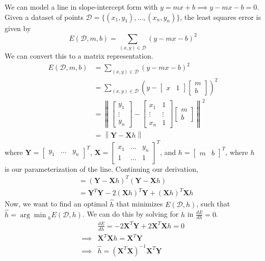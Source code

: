 \documentclass[a4paper, 12pt]{article}
\begin{document}
We can model a line in slope-intercept form with $y = mx + b \implies y - mx - b = 0$.  Given a dataset of points $\mathcal{D} = \{(x_1, y_1), ..., (x_n, y_n)\}$, the least squares error is given by
\[
E(\mathcal{D}, m, b) = \sum_{(x, y) \in \mathcal{D}} (y - mx - b)^2
\]
We can convert this to a matrix representation.
\begin{align*}
E(\mathcal{D}, m, b) &= \sum_{(x, y) \in \mathcal{D}} (y - mx - b)^2 \\
&= \sum_{(x, y) \in \mathcal{D}} \left(y - \begin{bmatrix} x & 1 \end{bmatrix} \begin{bmatrix} m \\ b \end{bmatrix} \right)^2 \\
&= \left\| \begin{bmatrix} y_1 \\ \vdots \\ y_n \end{bmatrix} - \begin{bmatrix} x_1 & 1 \\ \vdots & \vdots \\ x_n & 1 \end{bmatrix} \begin{bmatrix} m \\ b \end{bmatrix} \right\| ^2 \\
&= \left\| \textbf{Y} - \textbf{X}h \right\|
\end{align*}
where $\textbf{Y} = \begin{bmatrix} y_1 & \hdots & y_n \end{bmatrix}^T$, $\textbf{X} = \begin{bmatrix} x_1 & \hdots & y_n \\ 1 & \hdots & 1 \end{bmatrix}^T$, and $h = \begin{bmatrix} m & b \end{bmatrix}^T$, where $h$ is our parameterization of the line.  Continuing our derivation,
\begin{align*}
&= (\textbf{Y} - \textbf{X}h)^T (\textbf{Y} - \textbf{X}h) \\
&= \textbf{Y}^T \textbf{Y} - 2(\textbf{X}h)^T\textbf{Y} + (\textbf{X}h)^T\textbf{X}h
\end{align*}
Now, we want to find an optimal $\hat{h}$ that minimizes $E(\mathcal{D}, h)$, such that $\hat{h} = {\arg \min}_h E(\mathcal{D}, h)$.  We can do this by solving for $h$ in $\frac{dE}{dh} = 0$.
\begin{align*}
& \frac{dE}{dh} = -2\textbf{X}^T\textbf{Y} + 2 \textbf{X}^T \textbf{X} h = 0 \\
\implies & \textbf{X}^T \textbf{X} h = \textbf{X}^T\textbf{Y} \\
\implies & \boxed{\hat{h} = (\textbf{X}^T \textbf{X} )^{-1}\textbf{X}^T\textbf{Y}}
\end{align*}
\end{document}
